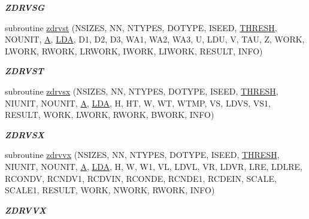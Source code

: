 \begin{DoxyCompactItemize}
\begin{DoxyCompactList}\small\item\em {\bfseries Z\+D\+R\+V\+S\+G} \end{DoxyCompactList}\item 
subroutine \hyperlink{group__complex16__eig_gaeb52cb23aa5a5fe5a884ba5413ea8d02}{zdrvst} (N\+S\+I\+Z\+E\+S, N\+N, N\+T\+Y\+P\+E\+S, D\+O\+T\+Y\+P\+E, I\+S\+E\+E\+D, \hyperlink{zlaqgs_8c_a0656018abfc9fa2821827415f5d5ea57}{T\+H\+R\+E\+S\+H}, N\+O\+U\+N\+I\+T, \hyperlink{classA}{A}, \hyperlink{example__user_8c_ae946da542ce0db94dced19b2ecefd1aa}{L\+D\+A}, D1, D2, D3, W\+A1, W\+A2, W\+A3, U, L\+D\+U, V, T\+A\+U, Z, W\+O\+R\+K, L\+W\+O\+R\+K, R\+W\+O\+R\+K, L\+R\+W\+O\+R\+K, I\+W\+O\+R\+K, L\+I\+W\+O\+R\+K, R\+E\+S\+U\+L\+T, I\+N\+F\+O)
\begin{DoxyCompactList}\small\item\em {\bfseries Z\+D\+R\+V\+S\+T} \end{DoxyCompactList}\item 
subroutine \hyperlink{group__complex16__eig_gaf5eb53e84bb7255969d88aba73a1dd82}{zdrvsx} (N\+S\+I\+Z\+E\+S, N\+N, N\+T\+Y\+P\+E\+S, D\+O\+T\+Y\+P\+E, I\+S\+E\+E\+D, \hyperlink{zlaqgs_8c_a0656018abfc9fa2821827415f5d5ea57}{T\+H\+R\+E\+S\+H}, N\+I\+U\+N\+I\+T, N\+O\+U\+N\+I\+T, \hyperlink{classA}{A}, \hyperlink{example__user_8c_ae946da542ce0db94dced19b2ecefd1aa}{L\+D\+A}, H, H\+T, W, W\+T, W\+T\+M\+P, V\+S, L\+D\+V\+S, V\+S1, R\+E\+S\+U\+L\+T, W\+O\+R\+K, L\+W\+O\+R\+K, R\+W\+O\+R\+K, B\+W\+O\+R\+K, I\+N\+F\+O)
\begin{DoxyCompactList}\small\item\em {\bfseries Z\+D\+R\+V\+S\+X} \end{DoxyCompactList}\item 
subroutine \hyperlink{group__complex16__eig_gad219aa578f2f410c3431c8d3642c28cb}{zdrvvx} (N\+S\+I\+Z\+E\+S, N\+N, N\+T\+Y\+P\+E\+S, D\+O\+T\+Y\+P\+E, I\+S\+E\+E\+D, \hyperlink{zlaqgs_8c_a0656018abfc9fa2821827415f5d5ea57}{T\+H\+R\+E\+S\+H}, N\+I\+U\+N\+I\+T, N\+O\+U\+N\+I\+T, \hyperlink{classA}{A}, \hyperlink{example__user_8c_ae946da542ce0db94dced19b2ecefd1aa}{L\+D\+A}, H, W, W1, V\+L, L\+D\+V\+L, V\+R, L\+D\+V\+R, L\+R\+E, L\+D\+L\+R\+E, R\+C\+O\+N\+D\+V, R\+C\+N\+D\+V1, R\+C\+D\+V\+I\+N, R\+C\+O\+N\+D\+E, R\+C\+N\+D\+E1, R\+C\+D\+E\+I\+N, S\+C\+A\+L\+E, S\+C\+A\+L\+E1, R\+E\+S\+U\+L\+T, W\+O\+R\+K, N\+W\+O\+R\+K, R\+W\+O\+R\+K, I\+N\+F\+O)
\begin{DoxyCompactList}\small\item\em {\bfseries Z\+D\+R\+V\+V\+X} \end{DoxyCompactList}\item 

\end{DoxyCompactItemize}
